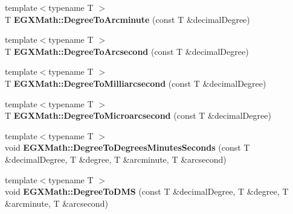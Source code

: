 \begin{DoxyCompactItemize}
\mbox{\label{group___e_g_x_math-_angle_conversions-_degree_ga8abf327dc5f52907b2c881999e9cc43e}} 
{\footnotesize template$<$typename T $>$ }\\T {\bfseries E\+G\+X\+Math\+::\+Degree\+To\+Arcminute} (const T \&decimal\+Degree)
\item 
\mbox{\label{group___e_g_x_math-_angle_conversions-_degree_gaf85e2d765c248f447854a807a68a5de8}} 
{\footnotesize template$<$typename T $>$ }\\T {\bfseries E\+G\+X\+Math\+::\+Degree\+To\+Arcsecond} (const T \&decimal\+Degree)
\item 
\mbox{\label{group___e_g_x_math-_angle_conversions-_degree_ga2c218e286b2ef72a00734dbc5a7f5ab6}} 
{\footnotesize template$<$typename T $>$ }\\T {\bfseries E\+G\+X\+Math\+::\+Degree\+To\+Milliarcsecond} (const T \&decimal\+Degree)
\item 
\mbox{\label{group___e_g_x_math-_angle_conversions-_degree_ga31b65388fe1b4656663b3d66b9d764e6}} 
{\footnotesize template$<$typename T $>$ }\\T {\bfseries E\+G\+X\+Math\+::\+Degree\+To\+Microarcsecond} (const T \&decimal\+Degree)
\item 
\mbox{\label{group___e_g_x_math-_angle_conversions-_degree_ga3b39266386e4249680593283c800a620}} 
{\footnotesize template$<$typename T $>$ }\\void {\bfseries E\+G\+X\+Math\+::\+Degree\+To\+Degrees\+Minutes\+Seconds} (const T \&decimal\+Degree, T \&degree, T \&arcminute, T \&arcsecond)
\item 
\mbox{\label{group___e_g_x_math-_angle_conversions-_degree_ga7dead1e0446ea77034caf1fd89f2ab24}} 
{\footnotesize template$<$typename T $>$ }\\void {\bfseries E\+G\+X\+Math\+::\+Degree\+To\+D\+MS} (const T \&decimal\+Degree, T \&degree, T \&arcminute, T \&arcsecond)
\item 
\mbox{\label{group___e_g_x_math-_angle_conversions-_degree_ga770b13da33b6f6c7bfa398cca7f24dbe}} 

\end{DoxyCompactItemize}
